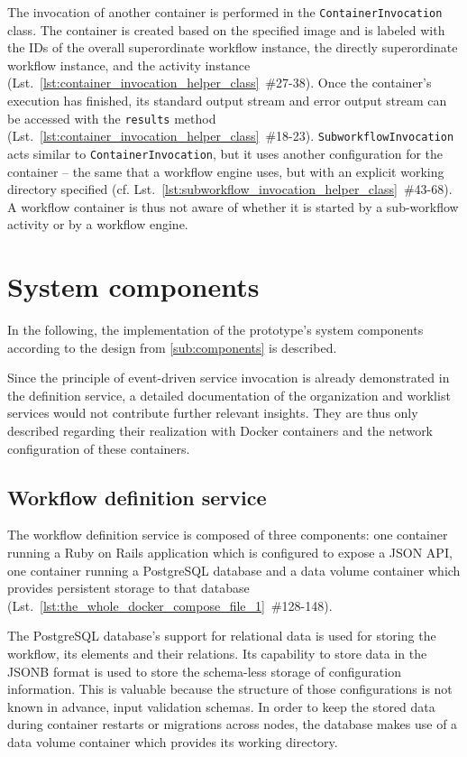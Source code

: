     The invocation of another container is performed in the \texttt{ContainerInvocation} class. The container is created based on the specified image and is labeled with the \acp{ID} of the overall superordinate workflow instance, the directly superordinate workflow instance, and the activity instance (Lst.~\ref{lst:container_invocation_helper_class}~\#27-38).
    Once the container's execution has finished, its standard output stream and error output stream can be accessed with the \texttt{results} method (Lst.~\ref{lst:container_invocation_helper_class}~\#18-23). \texttt{SubworkflowInvocation} acts similar to \texttt{ContainerInvocation}, but it uses another configuration for the container -- the same that a workflow engine uses, but with an explicit working directory specified (cf. Lst.~\ref{lst:subworkflow_invocation_helper_class}~\#43-68). A workflow container is thus not aware of whether it is started by a sub-workflow activity or by a workflow engine.


\section{System components} %
\label{sec:components_implementation}
    In the following, the implementation of the prototype's system components according to the design from  \ref{sub:components} is described.

    Since the principle of event-driven service invocation is already demonstrated in the definition service, a detailed documentation of the organization and worklist services would not contribute further relevant insights. They are thus only described regarding their realization with Docker containers and the network configuration of these containers.

  \subsection{Workflow definition service} %
    \label{sub:workflow_definition_service}
    The workflow definition service is composed of three components: one container running a Ruby on Rails application which is configured to expose a JSON API, one container running a PostgreSQL database and a data volume container which provides persistent storage to that database (Lst.~\ref{lst:the_whole_docker_compose_file_1}~\#128-148).

    The PostgreSQL database's support for relational data is used for storing the workflow, its elements and their relations. Its capability to store data in the JSONB format is used to store the schema-less storage of configuration information. This is valuable because the structure of those configurations is not known in advance, \eg input validation schemas.
    In order to keep the stored data during container restarts or migrations across nodes, the database makes use of a data volume container which provides its working directory.

